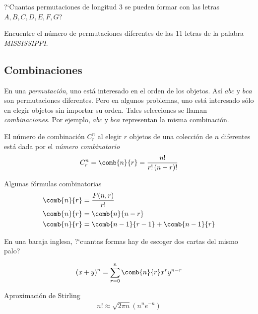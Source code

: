 {}
\begin{ejemplo}
	\label{exmp:1.16}
	?`Cuantas permutaciones de longitud 3 se pueden formar con las letras $A,B,C,D,E,F,G$?
\end{ejemplo}


{}
\begin{ejemplo}
	\label{exmp:1.17}
	Encuentre el número de permutaciones diferentes de las 11 letras de la palabra \emph{MISSISSIPPI}.
\end{ejemplo}


\subsection{Combinaciones}
{}
En una \emph{permutación}, uno está interesado en el orden de los objetos. Así $abc$ y $bca$ son permutaciones diferentes.  Pero en algunos problemas, uno está interesado sólo en elegir objetos sin importar su orden.  Tales selecciones se llaman \emph{combinaciones}.  Por ejemplo, $abc$ y $bca$ representan la misma combinación.



El número de combinación $ C^{n}_{r} $ al elegir $r$ objetos de una colección de $n$ diferentes está dada por el \emph{número combinatorio}
\begin{align}
	\label{1.29}
	C^{n}_{r} = \comb{n}{r}=\dfrac{n!}{r!\left( n-r \right)!}
\end{align}



{Algunas fórmulas combinatorias}
\begin{align}
	\label{1.30}
	\comb{n}{r}&=\dfrac{P(n,r)}{r!} \\
	\label{1.31}
	\comb{n}{r}&=\comb{n}{n-r}\\
	\comb{n}{r}&=\comb{n-1}{r-1}+\comb{n-1}{r}
\end{align}


{}
\begin{ejemplo}
	\label{exmp:1.18}
	En una baraja inglesa, ?`cuantas formas hay de escoger dos cartas del mismo palo?
\end{ejemplo}


{}
\begin{thm}
	\begin{align}
		\label{1.32}
		\left( x+y \right)^{n} = \sum_{r=0}^{n}\comb{n}{r}x^{r}y^{n-r}
	\end{align}
	
\end{thm}


{Aproximación de Stirling}
\begin{align}
	\label{1.33}
	n! \approx \sqrt{2\pi n}\left( n^{n}e^{-n} \right)
\end{align}


